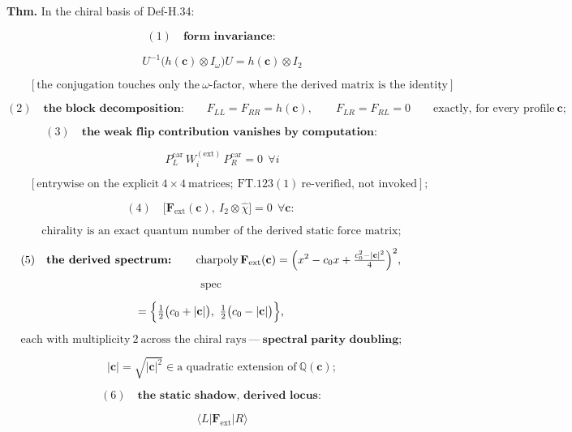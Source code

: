 \begin{theorem}\label{tag:FT-128}
\textbf{Thm.} In the chiral basis of Def-H.34:

\[
(1)\quad\textbf{form invariance:}
\]

\[
\qquad U^{-1}\bigl(h(\mathbf c)\otimes I_\omega\bigr)U=h(\mathbf c)\otimes I_2
\]

\[
\qquad [\text{the conjugation touches only the}\ \omega\text{-factor, where the derived matrix is the identity}];
\]

\[
(2)\quad\textbf{the block decomposition:}\qquad F_{LL}=F_{RR}=h(\mathbf c),\qquad F_{LR}=F_{RL}=0\qquad\text{exactly, for every profile}\ \mathbf c;
\]

\[
(3)\quad\textbf{the weak flip contribution vanishes by computation:}
\]

\[
\qquad P_L^{\mathrm{car}}\,W_i^{(\mathrm{ext})}\,P_R^{\mathrm{car}}=0\ \ \forall i
\]

\[
\qquad [\text{entrywise on the explicit}\ 4\times4\ \text{matrices};\ \mathrm{FT.123}(1)\ \text{re-verified, not invoked}];
\]

\[
(4)\quad\bigl[\mathbf F_{\mathrm{ext}}(\mathbf c),\ I_2\otimes\hat\chi\bigr]=0\ \ \forall\mathbf c:
\]

\[
\qquad \text{chirality is an exact quantum number of the derived static force matrix};
\]

\[
(5)\quad\textbf{the derived spectrum:}\qquad\operatorname{charpoly}\mathbf F_{\mathrm{ext}}(\mathbf c)=\Bigl(x^2-c_0x+\tfrac{c_0^2-|\mathbf c|^2}{4}\Bigr)^2,
\]

\[
\operatorname{spec}
\]

\[
= \Bigl\{\tfrac12\bigl(c_0+|\mathbf c|\bigr),\ \tfrac12\bigl(c_0-|\mathbf c|\bigr)\Bigr\},
\]

\[
\ \text{each with multiplicity}\ 2\ \text{across the chiral rays}\ —\ \textbf{spectral parity doubling};
\]

\[
\qquad |\mathbf c|=\sqrt{|\mathbf c|^2}\in\text{a quadratic extension of}\ \mathbb Q(\mathbf c);
\]

\[
(6)\quad\textbf{the static shadow, derived locus:}
\]

\[
\qquad \langle L|\mathbf F_{\mathrm{ext}}|R\rangle
\]


\end{theorem}
